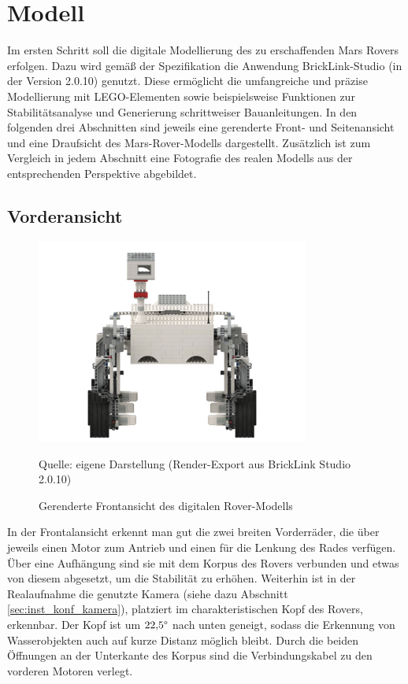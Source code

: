 \chapter{Modell}
\label{chp:modell}

Im ersten Schritt soll die digitale Modellierung des zu erschaffenden Mars Rovers erfolgen.
Dazu wird gemäß der Spezifikation die Anwendung BrickLink-Studio (in der Version 2.0.10) genutzt.
Diese ermöglicht die umfangreiche und präzise Modellierung mit LEGO-Elementen sowie beispielsweise Funktionen zur Stabilitätsanalyse und Generierung schrittweiser Bauanleitungen.
In den folgenden drei Abschnitten sind jeweils eine gerenderte Front- und Seitenansicht und eine Draufsicht des Mars-Rover-Modells dargestellt.
Zusätzlich ist zum Vergleich in jedem Abschnitt eine Fotografie des realen Modells aus der entsprechenden Perspektive abgebildet.

\section{Vorderansicht}
\label{sec:voderansicht}


\begin{figure}
	\centering
	\includegraphics[width=0.8\textwidth]{../Images/20200429_Mars_Rover_V5_front.png}
	\vspace{0.5em}
	\parbox[c]{0.8\linewidth}{\footnotesize
		\centering
		\vspace{1em}
		Quelle: eigene Darstellung (Render-Export aus BrickLink Studio 2.0.10)
	}
	\caption{Gerenderte Frontansicht des digitalen Rover-Modells}
	\label{fig:roverfrontrender}
\end{figure}

In der Frontalansicht erkennt man gut die zwei breiten Vorderräder, die über jeweils einen Motor zum Antrieb und einen für die Lenkung des Rades verfügen.
Über eine Aufhängung sind sie mit dem Korpus des Rovers verbunden und etwas von diesem abgesetzt, um die Stabilität zu erhöhen.
Weiterhin ist in der Realaufnahme die genutzte Kamera (siehe dazu Abschnitt \ref{sec:inst_konf_kamera}), platziert im charakteristischen Kopf des Rovers, erkennbar.
Der Kopf ist um $22{,}5 \degree$ nach unten geneigt, sodass die Erkennung von Wasserobjekten auch auf kurze Distanz möglich bleibt.
Durch die beiden Öffnungen an der Unterkante des Korpus sind die Verbindungskabel zu den vorderen Motoren verlegt.

